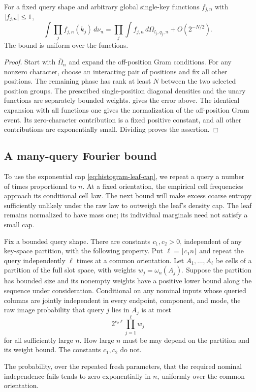 \begin{lemma}
\label{lem:reference-product}
For a fixed query shape and arbitrary global single-key functions
$f_{j,n}$ with $\lvert f_{j,n}\rvert\le1$,
\[
 \int\prod_jf_{j,n}(k_j)\,d\nu_n
 =\prod_j\int f_{j,n}\,d\Omega_{l_j,q_j,n}
   +O(2^{-N/2}).
\]
The bound is uniform over the functions.
\end{lemma}

\begin{proof}
Start with $\overline\Omega_n$ and expand the off-position Gram
conditions. For any nonzero character, choose an interacting pair of
positions and fix all other positions. The remaining phase has rank
at least $N$ between the two selected position groups. The prescribed
single-position diagonal densities and the unary functions are
separately bounded weights.  gives the error above.
The identical expansion with all functions one gives the normalization
of the off-position Gram event. Its zero-character contribution is a
fixed positive constant, and all other contributions are exponentially
small. Dividing proves the assertion.
\end{proof}

\subsection{A many-query Fourier bound}

To use the exponential cap \eqref{eq:histogram-leaf-cap}, we repeat a
query a number of times proportional to $n$. At a fixed orientation,
the empirical cell frequencies approach its conditional cell law. The next
bound will make excess coarse entropy sufficiently unlikely under the
raw law to outweigh the leaf's density cap. The leaf remains normalized
to have mass one; its individual marginals need not satisfy a small cap.

\begin{lemma}
\label{lem:histogram-many-queries}
Fix a bounded query shape. There are constants $c_1,c_2>0$, independent
of any key-space partition, with the following property. Put
$\ell=\lfloor c_1n\rfloor$ and repeat the query independently $\ell$
times at a common orientation. Let $A_1,\ldots,A_\ell$ be cells of a
partition of the full slot space, with weights
$w_j=\omega_n(A_j)$. Suppose the partition has bounded size and its
nonempty weights have a positive lower bound along the sequence under
consideration. Conditional on any nominal inputs whose queried columns
are jointly independent in every endpoint, component, and mode, the
raw image probability that query $j$ lies in $A_j$ is at most
\begin{equation}\label{eq:histogram-many-query-bound}
 2^{c_2\ell}\prod_{j=1}^{\ell}w_j
\end{equation}
for all sufficiently large $n$. How large $n$ must be may depend on the
partition and its weight bound. The constants $c_1,c_2$ do not.

The probability, over the repeated fresh parameters, that the required
nominal independence fails tends to zero exponentially in $n$, uniformly
over the common orientation.
\end{lemma}

